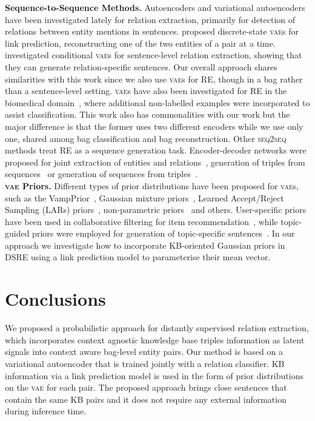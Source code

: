 \documentclass[11pt]{article}
\begin{document}
\noindent \textbf{Sequence-to-Sequence Methods.} 
Autoencoders and variational autoencoders have been investigated lately for relation extraction, primarily for detection of relations between entity mentions in sentences. \citet{marcheggiani2016discrete} proposed discrete-state \textsc{vae}s for link prediction, reconstructing one of the two entities of a pair at a time.
\citet{ma2019mcvae} investigated conditional \textsc{vae}s for sentence-level relation extraction, showing that they can generate relation-specific sentences. Our overall approach shares similarities with this work since we also use \textsc{vae}s for RE, though in a bag rather than a sentence-level setting.
\textsc{vae}s have also been investigated for RE in the biomedical domain~\citep{zhang2019exploring}, where additional non-labelled examples were incorporated to assist classification. 
This work also has commonalities with our work but the major difference is that the former uses two different encoders while we use only one, shared among bag classification and bag reconstruction.
Other \textsc{seq2seq} methods treat RE as a sequence generation task. Encoder-decoder networks were proposed for joint extraction of entities and relations~\citep{trisedya2019neural,nayak2020effective}, generation of triples from sequences~\citep{liu2018seq2rdf} or generation of sequences from triples~\citep{trisedya2018gtr,zhu2019triple}. \\


\noindent \textbf{\textsc{vae} Priors.}
Different types of prior distributions have been proposed for \textsc{vae}s, such as the VampPrior~\citep{tomczak2018vae}, Gaussian mixture priors~\citep{dilokthanakul2016deep}, Learned Accept/Reject Sampling (LARs) priors~\citep{bauer2019resampled}, non-parametric priors~\citep{goyal2017nonparametric} and others.
User-specific priors have been used in collaborative filtering for item recommendation~\citep{karamanolakis2018item}, while topic-guided priors were employed for generation of topic-specific sentences~\citep{wang2019topic}.
In our approach we investigate how to incorporate KB-oriented Gaussian priors in DSRE using a link prediction model to parameterise their mean vector.



\section{Conclusions} 
We proposed a probabilistic approach for distantly supervised relation extraction, which incorporates context agnostic knowledge base triples information as latent signals into context aware bag-level entity pairs.
Our method is based on a variational autoencoder that is trained jointly with a relation classifier. KB information via a link prediction model is used in the form of prior distributions on the \textsc{vae} for each pair. The proposed approach brings close sentences that contain the same KB pairs and it does not require any external information during inference time.
\end{document}
